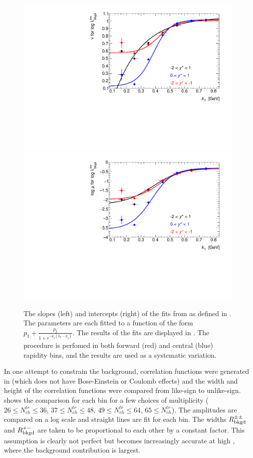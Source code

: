 \begin{figure}[t]
\begin{minipage}[t]{1.0\textwidth}
\centering
\includegraphics[width=.49\linewidth]{can_kt_qinv_backLambda_slope_combined.pdf}
\includegraphics[width=.49\linewidth]{can_kt_qinv_backLambda_intercept_combined.pdf}
\end{minipage}
\caption{The slopes (left) and intercepts (right) of the fits from  as defined in . The parameters are each fitted to a function of the form $p_1 + \frac{p_2}{1 + e^{-p_3(k_T - p_4)}}$. The results of the fits are displayed in . The procedure is perfomed in both forward (red) and central (blue) rapidity bins, and the results are used as a systematic variation.}
\label{fig:background_qinv_same_vs_opp_pythia8_fits}
\end{figure}

In one attempt to constrain the background, correlation functions were generated in  (which does not have Bose-Einstein or Coulomb effects) and the width and height of the correlation functions were compared from like-sign to unlike-sign.
 shows the comparison for each \kt bin for a few choices of multiplicity ($26 \leq N_{ch}^{tr} \leq36$, $37 \leq N_{ch}^{tr} \leq48$, $49 \leq N_{ch}^{tr} \leq64$, $65 \leq N_{ch}^{tr}$).
The amplitudes are compared on a log scale and straight lines are fit for each \kt bin.
The widths $R_{\mathrm{bkgd}}^{\pm\pm}$ and $R_{\mathrm{bkgd}}^{+-}$ are taken to be proportional to each other by a constant factor.
This assumption is clearly not perfect but becomes increasingly accurate at high \kt, where the background contribution is largest.

